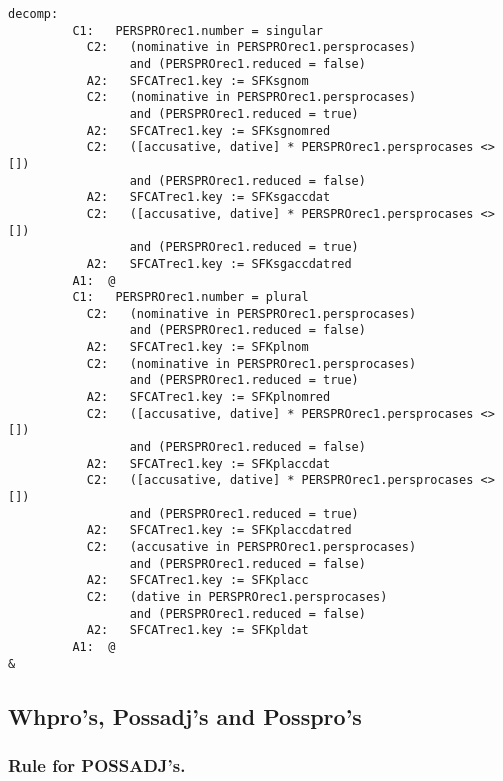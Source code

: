 \begin{verbatim}
decomp:  
         C1:   PERSPROrec1.number = singular
           C2:   (nominative in PERSPROrec1.persprocases) 
                 and (PERSPROrec1.reduced = false)
           A2:   SFCATrec1.key := SFKsgnom
           C2:   (nominative in PERSPROrec1.persprocases) 
                 and (PERSPROrec1.reduced = true)
           A2:   SFCATrec1.key := SFKsgnomred
           C2:   ([accusative, dative] * PERSPROrec1.persprocases <> []) 
                 and (PERSPROrec1.reduced = false)
           A2:   SFCATrec1.key := SFKsgaccdat
           C2:   ([accusative, dative] * PERSPROrec1.persprocases <> []) 
                 and (PERSPROrec1.reduced = true)
           A2:   SFCATrec1.key := SFKsgaccdatred
         A1:  @
         C1:   PERSPROrec1.number = plural
           C2:   (nominative in PERSPROrec1.persprocases) 
                 and (PERSPROrec1.reduced = false)
           A2:   SFCATrec1.key := SFKplnom
           C2:   (nominative in PERSPROrec1.persprocases) 
                 and (PERSPROrec1.reduced = true)
           A2:   SFCATrec1.key := SFKplnomred
           C2:   ([accusative, dative] * PERSPROrec1.persprocases <> []) 
                 and (PERSPROrec1.reduced = false)
           A2:   SFCATrec1.key := SFKplaccdat
           C2:   ([accusative, dative] * PERSPROrec1.persprocases <> []) 
                 and (PERSPROrec1.reduced = true)
           A2:   SFCATrec1.key := SFKplaccdatred
           C2:   (accusative in PERSPROrec1.persprocases) 
                 and (PERSPROrec1.reduced = false)
           A2:   SFCATrec1.key := SFKplacc
           C2:   (dative in PERSPROrec1.persprocases) 
                 and (PERSPROrec1.reduced = false)
           A2:   SFCATrec1.key := SFKpldat
         A1:  @
&
\end{verbatim}
\newpage
\subsection{Whpro's, Possadj's and Posspro's}
\subsubsection{Rule for POSSADJ's.}

